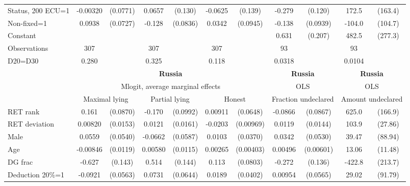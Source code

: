 \begin{tabular}{l|cccccc|cc|cc}
Status, 200 ECU=1& -0.00320         & (0.0771)&   0.0657         &  (0.130)&  -0.0625         &  (0.139)&   -0.279\sym{**} &  (0.120)&    172.5         &  (163.4)\\
Non-fixed=1     &   0.0938         & (0.0727)&   -0.128         & (0.0836)&   0.0342         & (0.0945)&   -0.138         & (0.0939)&   -104.0         &  (104.7)\\
Constant        &                  &         &                  &         &                  &         &    0.631\sym{***}&  (0.207)&    482.5\sym{*}  &  (277.3)\\
\hline
Observations    &      307         &         &      307         &         &      307         &         &       93         &         &       93         &         \\
D20=D30         &    0.280         &         &    0.325         &         &    0.118         &         &   0.0318         &         &   0.0104         &         \\
\hline\hline
&\multicolumn{6}{c|}{\bf Russia}&\multicolumn{2}{c|}{\bf Russia}&\multicolumn{2}{c}{\bf Russia}\\ &\multicolumn{6}{c|}{Mlogit, average marginal effects }&\multicolumn{2}{c|}{OLS}&\multicolumn{2}{c}{OLS}\\
                &\multicolumn{2}{c}{Maximal lying}&\multicolumn{2}{c}{Partial lying}&\multicolumn{2}{c}{Honest}  &\multicolumn{2}{c}{Fraction undeclared}&\multicolumn{2}{c}{Amount undeclared}\\
\hline
RET rank        &    0.161\sym{*}  & (0.0870)&   -0.170\sym{*}  & (0.0992)&  0.00911         & (0.0648)&  -0.0866         & (0.0867)&    625.0\sym{***}&  (166.9)\\
RET deviation   &  0.00820         & (0.0153)&   0.0121         & (0.0161)&  -0.0203\sym{**} &(0.00969)&   0.0119         & (0.0144)&    103.9\sym{***}&  (27.86)\\
Male            &   0.0559         & (0.0540)&  -0.0662         & (0.0587)&   0.0103         & (0.0370)&   0.0342         & (0.0530)&    39.47         &  (88.94)\\
Age             & -0.00846         & (0.0119)&  0.00580         & (0.0115)&  0.00265         &(0.00403)&  0.00496         &(0.00601)&    13.06         &  (11.48)\\
DG frac         &   -0.627\sym{***}&  (0.143)&    0.514\sym{***}&  (0.144)&    0.113         & (0.0803)&   -0.272\sym{**} &  (0.136)&   -422.8\sym{**} &  (213.7)\\
Deduction 20\%=1&  -0.0921         & (0.0563)&   0.0731         & (0.0644)&   0.0189         & (0.0402)&  0.00954         & (0.0565)&    29.02         &  (91.79)\\

\end{tabular}
